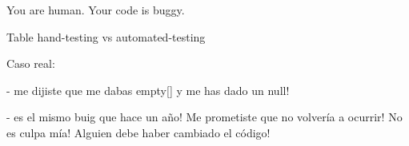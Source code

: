 
You are human. Your code is buggy.

Table hand-testing vs automated-testing





Caso real: 

  - me dijiste que me dabas empty[] y me has dado un null!


  - es el mismo buig que hace un año! Me prometiste que no volvería a
  ocurrir!
    No es culpa mía! Alguien debe haber cambiado el código!

